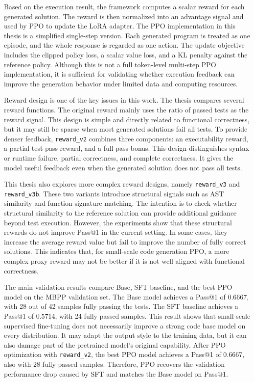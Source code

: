 \begin{digest}
Based on the execution result, the framework computes a scalar reward for each generated solution. The reward is then normalized into an advantage signal and used by PPO to update the LoRA adapter. The PPO implementation in this thesis is a simplified single-step version. Each generated program is treated as one episode, and the whole response is regarded as one action. The update objective includes the clipped policy loss, a scalar value loss, and a KL penalty against the reference policy. Although this is not a full token-level multi-step PPO implementation, it is sufficient for validating whether execution feedback can improve the generation behavior under limited data and computing resources.

Reward design is one of the key issues in this work. The thesis compares several reward functions. The original reward mainly uses the ratio of passed tests as the reward signal. This design is simple and directly related to functional correctness, but it may still be sparse when most generated solutions fail all tests. To provide denser feedback, \texttt{reward\_v2} combines three components: an executability reward, a partial test pass reward, and a full-pass bonus. This design distinguishes syntax or runtime failure, partial correctness, and complete correctness. It gives the model useful feedback even when the generated solution does not pass all tests.

This thesis also explores more complex reward designs, namely \texttt{reward\_v3} and \texttt{reward\_v3b}. These two variants introduce structural signals such as AST similarity and function signature matching. The intention is to check whether structural similarity to the reference solution can provide additional guidance beyond test execution. However, the experiments show that these structural rewards do not improve Pass@1 in the current setting. In some cases, they increase the average reward value but fail to improve the number of fully correct solutions. This indicates that, for small-scale code generation PPO, a more complex proxy reward may not be better if it is not well aligned with functional correctness.

The main validation results compare Base, SFT baseline, and the best PPO model on the MBPP validation set. The Base model achieves a Pass@1 of 0.6667, with 28 out of 42 samples fully passing the tests. The SFT baseline achieves a Pass@1 of 0.5714, with 24 fully passed samples. This result shows that small-scale supervised fine-tuning does not necessarily improve a strong code base model on every distribution. It may adapt the output style to the training data, but it can also damage part of the pretrained model's original capability. After PPO optimization with \texttt{reward\_v2}, the best PPO model achieves a Pass@1 of 0.6667, also with 28 fully passed samples. Therefore, PPO recovers the validation performance drop caused by SFT and matches the Base model on Pass@1.


\end{digest}
